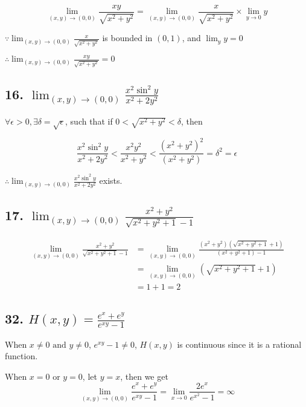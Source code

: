 \documentclass{article}
\begin{document}
    $$\lim_{(x, y) \to (0, 0)} \frac{xy}{\sqrt{x^2 + y^2}} = \lim_{(x, y) \to (0, 0)} \frac{x}{\sqrt{x^2 + y^2}} \times \lim_{y \to 0} y$$

    $\because \lim_{(x, y) \to (0, 0)} \frac{x}{\sqrt{x^2 + y^2}}$ is bounded in $(0, 1)$, and $\lim_y y = 0$

    $\therefore \lim_{(x, y) \to (0, 0)} \frac{xy}{\sqrt{x^2 + y^2}} = 0$

    \subsection*{16. $\lim_{(x, y) \to (0, 0)} \frac{x^2\sin^2 y}{x^2 + 2y^2}$}

    $\forall \epsilon > 0, \exists \delta = \sqrt{\epsilon}$, such that if $0 < \sqrt{x^2 + y^2} < \delta$, then

    $$\frac{x^2\sin^2 y}{x^2 + 2y^2} < \frac{x^2y^2}{x^2 + y^2} < \frac{(x^2 + y^2)^2}{(x^2 + y^2)} = \delta^2 = \epsilon$$

    $\therefore \lim_{(x, y) \to (0, 0)} \frac{x^2\sin^2 y}{x^2 + 2y^2}$ exists.

    \subsection*{17. $\lim_{(x, y) \to (0, 0)} \frac{x^2 + y^2}{\sqrt{x^2 + y^2 + 1} - 1}$}

    $$\begin{aligned}
        \lim_{(x, y) \to (0, 0)} \frac{x^2 + y^2}{\sqrt{x^2 + y^2 + 1} - 1} &= \lim_{(x, y)\to (0, 0)} \frac{(x^2 + y^2)(\sqrt{x^2 + y^2 + 1} + 1)}{(x^2 + y^2 + 1) - 1} \\
        &= \lim_{(x, y) \to (0, 0)}(\sqrt{x^2 + y^2 + 1} + 1) \\ 
        &= 1 + 1 = 2
    \end{aligned}$$

    \subsection*{32. $H(x, y) = \frac{e^x + e^y}{e^{xy} - 1}$}

    When $x \not = 0 \textrm{ and } y \not = 0$, $e^{xy} - 1 \not = 0$, $H(x, y)$ is continuous since it is a rational function.

    When $x = 0 \textrm{ or } y = 0$, let $y = x$, then we get $$\lim_{(x, y) \to (0, 0)}\frac{e^x + e^y}{e^{xy} - 1} = \lim_{x \to 0}\frac{2e^x}{e^{x^2} - 1} = \infty$$
\end{document}
